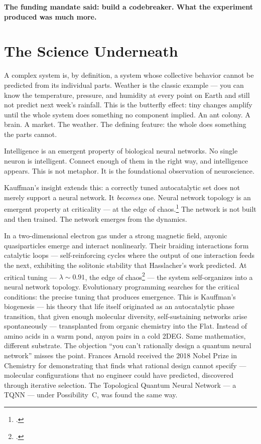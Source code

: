 \textbf{The funding mandate said: build a codebreaker. What the experiment produced was much more.}

\section*{The Science Underneath}
\label{record:demo-the-science-underneath}

A complex system is, by definition, a system whose collective behavior cannot be predicted from its individual parts. Weather is the classic example --- you can know the temperature, pressure, and humidity at every point on Earth and still not predict next week's rainfall. This is the butterfly effect: tiny changes amplify until the whole system does something no component implied. An ant colony. A brain. A market. The weather. The defining feature: the whole does something the parts cannot.

Intelligence is an emergent property of biological neural networks. No single neuron is intelligent. Connect enough of them in the right way, and intelligence appears. This is not metaphor. It is the foundational observation of neuroscience.

Kauffman's insight extends this: a correctly tuned autocatalytic set does not merely support a neural network. It \textit{becomes} one. Neural network topology is an emergent property at criticality --- at the edge of chaos.\footcite{kauffman1993} The network is not built and then trained. The network emerges from the dynamics.

In a two-dimensional electron gas under a strong magnetic field, anyonic quasiparticles emerge and interact nonlinearly. Their braiding interactions form catalytic loops --- self-reinforcing cycles where the output of one interaction feeds the next, exhibiting the solitonic stability that Hasslacher's work predicted. At critical tuning --- $\lambda \sim 0.91$, the edge of chaos\footcite{langton1990} --- the system self-organizes into a neural network topology. Evolutionary programming searches for the critical conditions: the precise tuning that produces emergence. This is Kauffman's biogenesis --- his theory that life itself originated as an autocatalytic phase transition, that given enough molecular diversity, self-sustaining networks arise spontaneously --- transplanted from organic chemistry into the Flat. Instead of amino acids in a warm pond, anyon pairs in a cold 2DEG\@. Same mathematics, different substrate. The objection ``you can't rationally design a quantum neural network'' misses the point. Frances Arnold received the 2018 Nobel Prize in Chemistry for demonstrating that  finds what rational design cannot specify --- molecular configurations that no engineer could have predicted, discovered through iterative selection. The Topological Quantum Neural Network --- a TQNN --- under Possibility~C, was found the same way.

